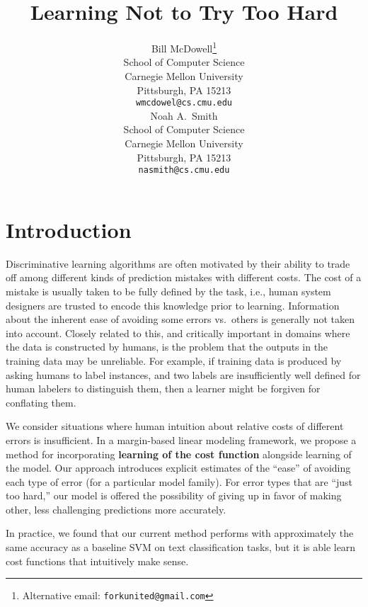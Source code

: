 \documentclass{article} %
\title{Learning Not to Try Too Hard}
\author{
Bill McDowell\thanks{Alternative email: \texttt{forkunited@gmail.com}} \\
School of Computer Science\\
Carnegie Mellon University\\
Pittsburgh, PA 15213 \\
\texttt{wmcdowel@cs.cmu.edu} \\
\And
Noah A.~Smith \\
School of Computer Science\\
Carnegie Mellon University\\
Pittsburgh, PA 15213 \\
\texttt{nasmith@cs.cmu.edu} \\
}
\newcommand{\bmcomment}[1]{\textcolor{blue}{\textsc{\textbf{[#1 --bm]}}}}
\newcommand{\nascomment}[1]{\textcolor{red}{\textsc{\textbf{[#1 --nas]}}}}
\begin{document}
\maketitle



\section{Introduction}

Discriminative learning algorithms are often motivated by their
ability to trade off among different kinds of prediction mistakes with
different costs.  The cost of a mistake is usually taken to be fully
defined by the task, i.e., human system designers are trusted to
encode this knowledge prior to learning.  Information about the
inherent ease of avoiding some errors vs.~others is generally not
taken into account.   Closely related to this, and critically
important in domains where the data is constructed by humans, is the
problem that the outputs in the training data may be unreliable.  For
example, if training data is produced by asking humans to label
instances, and two labels are insufficiently well defined for human
labelers to distinguish them,
then a learner might be forgiven for conflating them.

We consider situations where human intuition about relative costs of
different errors is insufficient.  In a margin-based linear modeling
framework, we propose a method for incorporating \textbf{learning of
  the cost function} alongside learning of the model.  Our approach
introduces explicit estimates of the ``ease'' of avoiding each type of
error
(for a particular model family).   For error types that are ``just too
hard,'' our model is offered the possibility of giving up in favor of
making other, less challenging predictions more accurately.

In practice, we found that our current method performs with 
approximately the same accuracy as a baseline SVM on text 
classification tasks, but it is able learn cost functions
that intuitively make sense.

\end{document}
